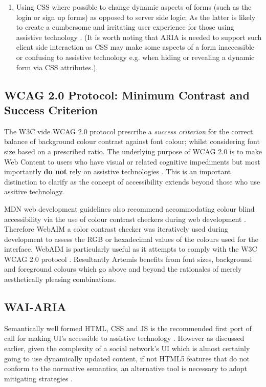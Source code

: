 \begin{enumerate}
\begin{enumerate}
        \item Using CSS where possible to change dynamic aspects of forms (such as the login or sign up forms) as opposed to server side logic; As the latter is likely to create a cumbersome and irritating user experience for those using assistive technology \cite{Mills}. (It is worth noting that ARIA is needed to support such client side interaction as CSS may make some aspects of a form inaccessible or confusing to assistive technology e.g. when hiding or revealing a dynamic form via CSS attributes.).
        
    \end{enumerate}
\end{enumerate}

    

\subsection{WCAG 2.0 Protocol: Minimum Contrast and Success Criterion}

    
    The W3C vide WCAG 2.0 protocol \cite{W3Ca,W3Cb} prescribe a \textit{success criterion} for the correct balance of background colour contrast against font colour; whilst considering font size based on a prescribed ratio. The underlying purpose of WCAG 2.0 is to make Web Content to users who have visual or related cognitive impediments but most importantly \textbf{do not} rely on assistive technologies \cite{W3Ca,W3Cb}. This is an important distinction to clarify as the concept of accessibility extends beyond those who use assitive technology.
    
    MDN web development guidelines also recommend accommodating  colour blind accessibility via the use of colour contrast checkers during web development \cite{Mills}. Therefore WebAIM a color contrast checker was iteratively used during development to assess the RGB or hexadecimal values of the colours used for the interface. WebAIM is particularly useful as it attempts to comply with the W3C WCAG 2.0 protocol \cite{WebAIM,W3Ca,W3Cb}. Resultantly Artemis benefits from font sizes, background and foreground colours which go above and beyond the rationales of merely aesthetically pleasing combinations.
    

\subsection{WAI-ARIA}

Semantically well formed HTML, CSS and JS is the recommended first port of call for making UI's accessible to assistive technology \cite{Sukardi2016}. However as discussed earlier, given the complexity of a social network's UI which is almost certainly going to use  dynamically updated content, if not HTML5 features that do not conform to the normative semantics, an alternative tool is necessary to adopt mitigating strategies \cite{Sukardi2016}.

